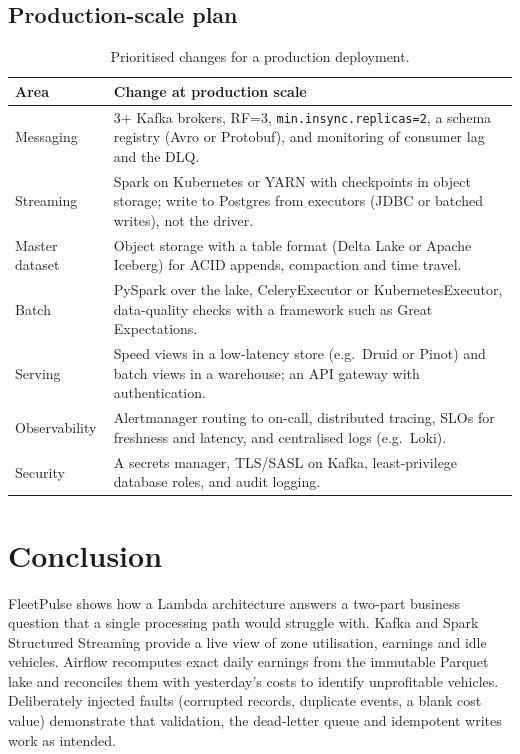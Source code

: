 \documentclass[11pt,a4paper]{article}
\newcommand{\code}[1]{\texttt{\small #1}}
\begin{document}
\subsection{Production-scale plan}

\begin{table}[H]
\centering\small
\begin{tabularx}{\linewidth}{l Y}
\toprule
\textbf{Area} & \textbf{Change at production scale} \\
\midrule
Messaging & 3+ Kafka brokers, RF=3, \code{min.insync.replicas=2}, a schema registry (Avro or
Protobuf), and monitoring of consumer lag and the DLQ. \\
Streaming & Spark on Kubernetes or YARN with checkpoints in object storage; write to Postgres
from executors (JDBC or batched writes), not the driver. \\
Master dataset & Object storage with a table format (Delta Lake or Apache Iceberg) for ACID
appends, compaction and time travel. \\
Batch & PySpark over the lake, CeleryExecutor or KubernetesExecutor, data-quality checks with a
framework such as Great Expectations. \\
Serving & Speed views in a low-latency store (e.g.\ Druid or Pinot) and batch views in a
warehouse; an API gateway with authentication. \\
Observability & Alertmanager routing to on-call, distributed tracing, SLOs for freshness and
latency, and centralised logs (e.g.\ Loki). \\
Security & A secrets manager, TLS/SASL on Kafka, least-privilege database roles, and audit
logging. \\
\bottomrule
\end{tabularx}
\caption{Prioritised changes for a production deployment.}
\label{tab:prod}
\end{table}

\section{Conclusion}

FleetPulse shows how a Lambda architecture answers a two-part business question that a single
processing path would struggle with. Kafka and Spark Structured Streaming provide a live view of
zone utilisation, earnings and idle vehicles. Airflow recomputes exact daily earnings from the
immutable Parquet lake and reconciles them with yesterday's costs to identify unprofitable
vehicles. Deliberately injected faults (corrupted records, duplicate events, a blank cost value)
demonstrate that validation, the dead-letter queue and idempotent writes work as intended.
\end{document}
